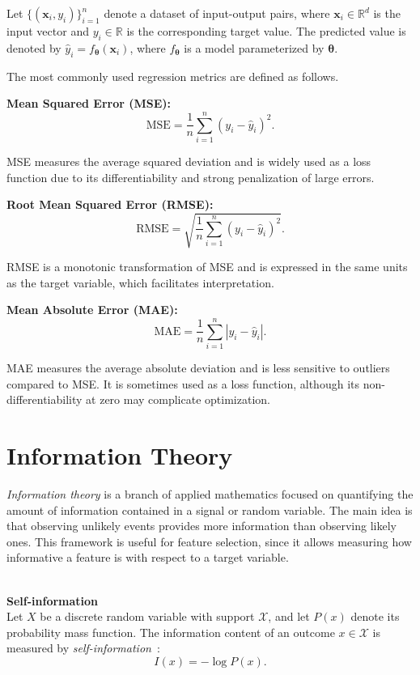 Let $\{(\mathbf{x}_i, y_i)\}_{i=1}^{n}$ denote a dataset of input-output pairs, where $\mathbf{x}_i \in \mathbb{R}^d$ is the input vector and $y_i \in \mathbb{R}$ is the corresponding target value. The predicted value is denoted by $\hat{y}_i = f_{\boldsymbol{\theta}}(\mathbf{x}_i)$, where $f_{\boldsymbol{\theta}}$ is a model parameterized by $\boldsymbol{\theta}$.

The most commonly used regression metrics are defined as follows.

\textbf{Mean Squared Error (MSE):}
\begin{equation*}
\text{MSE} = \frac{1}{n} \sum_{i=1}^{n} (y_i - \hat{y}_i)^2.
\end{equation*}

MSE measures the average squared deviation and is widely used as a loss function due to its differentiability and strong penalization of large errors.

\textbf{Root Mean Squared Error (RMSE):}
\begin{equation*}
\text{RMSE} = \sqrt{\frac{1}{n} \sum_{i=1}^{n} (y_i - \hat{y}_i)^2}.
\end{equation*}

RMSE is a monotonic transformation of MSE and is expressed in the same units as the target variable, which facilitates interpretation.

\textbf{Mean Absolute Error (MAE):}
\begin{equation*}
\text{MAE} = \frac{1}{n} \sum_{i=1}^{n} |y_i - \hat{y}_i|.
\end{equation*}

MAE measures the average absolute deviation and is less sensitive to outliers compared to MSE. It is sometimes used as a loss function, although its \break non-differentiability at zero may complicate optimization.

\section{Information Theory}
\label{sec:information-theory}
\emph{Information theory} is a branch of applied mathematics focused on quantifying the amount of information contained in a signal or random variable. The main idea is that observing unlikely events provides more information than observing likely ones. This framework is useful for feature selection, since it allows measuring how informative a feature is with respect to a target variable.

\textbf{\\Self-information\\}
Let $X$ be a discrete random variable with support $\mathcal{X}$, and let $P(x)$ denote its probability mass function. The information content of an outcome $x \in \mathcal{X}$ is measured by \emph{self-information}~\cite{shannon1948}:
\begin{equation*}
I(x) = -\log P(x).
\end{equation*}


